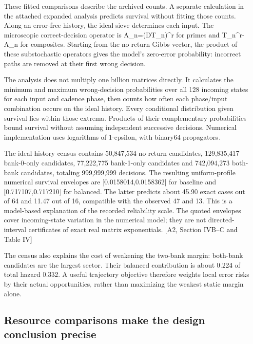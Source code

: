 These fitted comparisons describe the archived counts. A separate calculation in the attached expanded analysis predicts survival without fitting those counts. Along an error-free history, the ideal sieve determines each input. The microscopic correct-decision operator is A\_n=(DT\_n)\^{}r for primes and T\_n\^{}r-A\_n for composites. Starting from the no-return Gibbs vector, the product of these substochastic operators gives the model's zero-error probability: incorrect paths are removed at their first wrong decision.

The analysis does not multiply one billion matrices directly. It calculates the minimum and maximum wrong-decision probabilities over all 128 incoming states for each input and cadence phase, then counts how often each phase/input combination occurs on the ideal history. Every conditional distribution given survival lies within those extrema. Products of their complementary probabilities bound survival without assuming independent successive decisions. Numerical implementation uses logarithms of 1-epsilon, with binary64 propagators.

The ideal-history census contains 50,847,534 no-return candidates, 129,835,417 bank-0-only candidates, 77,222,775 bank-1-only candidates and 742,094,273 both-bank candidates, totaling 999,999,999 decisions. The resulting uniform-profile numerical survival envelopes are {[}0.0158014,0.0158362{]} for baseline and {[}0.717107,0.717210{]} for balanced. The latter predicts about 45.90 exact cases out of 64 and 11.47 out of 16, compatible with the observed 47 and 13. This is a model-based explanation of the recorded reliability scale. The quoted envelopes cover incoming-state variation in the numerical model; they are not directed-interval certificates of exact real matrix exponentials. {[}A2, Section IVB--C and Table IV{]}

The census also explains the cost of weakening the two-bank margin: both-bank candidates are the largest sector. Their balanced contribution is about 0.224 of total hazard 0.332. A useful trajectory objective therefore weights local error risks by their actual opportunities, rather than maximizing the weakest static margin alone.

\subsection{Resource comparisons make the design conclusion precise}\label{resource-comparisons-make-the-design-conclusion-precise}

